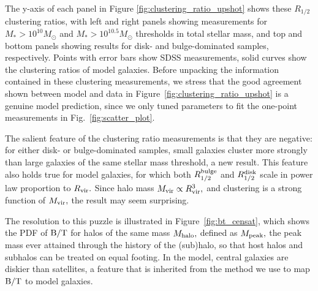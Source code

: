 \documentclass[usenatbib,usegraphicx,letterpaper]{mn2e}
\newcommand{\rhalf}{R_{1/2}}
\newcommand{\rhalfdisk}{R_{1/2}^{\rm disk}}
\newcommand{\rhalfbulge}{R_{1/2}^{\rm bulge}}
\newcommand{\bt}{{\rm B/T}}
\newcommand{\mstar}{M_{\ast}}
\newcommand{\mvir}{M_{\rm vir}}
\newcommand{\mpeak}{M_{\rm peak}}
\newcommand{\mhalo}{M_{\rm halo}}
\newcommand{\rvir}{R_{\rm vir}}
\begin{document}
The y-axis of each panel in Figure \ref{fig:clustering_ratio_upshot} shows these $\rhalf$ clustering ratios, with left and right panels showing measurements for $\mstar>10^{10}M_{\odot}$ and $\mstar>10^{10.5}M_{\odot}$ thresholds in total stellar mass, and top and bottom panels showing results for disk- and bulge-dominated samples, respectively. Points with error bars show SDSS measurements, solid curves show the clustering ratios of model galaxies. Before unpacking the information contained in these clustering measurements, we stress that the good agreement shown between model and data in Figure~\ref{fig:clustering_ratio_upshot} is a genuine model prediction, since we only tuned parameters to fit the one-point measurements in Fig.~\ref{fig:scatter_plot}.

The salient feature of the clustering ratio measurements is that they are negative: for either disk- or bulge-dominated samples, small galaxies cluster more strongly than large galaxies of the same stellar mass threshold, a new result. This feature also holds true for model galaxies, for which both $\rhalfbulge$ and $\rhalfdisk$ scale in power law proportion to $\rvir.$ Since halo mass $\mvir\propto\rvir^{3},$ and clustering is a strong function of $\mvir,$ the result may seem surprising.

The resolution to this puzzle is illustrated in Figure~\ref{fig:bt_censat}, which shows the PDF of $\bt$ for halos of the same mass $\mhalo,$ defined as $\mpeak,$ the peak mass ever attained through the history of the (sub)halo, so that host halos and subhalos can be treated on equal footing. In the model, central galaxies are diskier than satellites, a feature that is inherited from the method we use to map $\bt$ to model galaxies.
\end{document}
